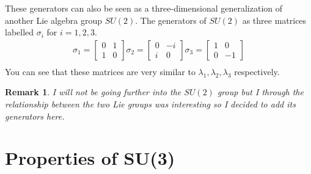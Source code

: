 \documentclass[12pt]{article}
\newtheorem*{rem}{Remark}
\begin{document}
These generators can also be seen as a three-dimensional generalization of another Lie algebra group $SU(2)$. The generators of $SU(2)$ as three matrices labelled $\sigma_i$ for $i = 1,2,3$.
\begin{align*}
\sigma_1 = \left[ \begin{matrix}
	0 & 1 \\
	1 & 0 
	\end{matrix} \right]
\sigma_2 = \left[ \begin{matrix}
	0 & -i \\
	i & 0 
	\end{matrix} \right]
\sigma_3 = \left[ \begin{matrix}
	1 & 0 \\
	0 & -1
	\end{matrix} \right]\\
\end{align*}
You can see that these matrices are very similar to $\lambda_1,\lambda_2,\lambda_3$ respectively.
\begin{rem}
I will not be going further into the $SU(2)$ group but I through the relationship between the two Lie groups was interesting so I decided to add its generators here.
\end{rem}

\section{Properties of SU(3)}
\end{document}
